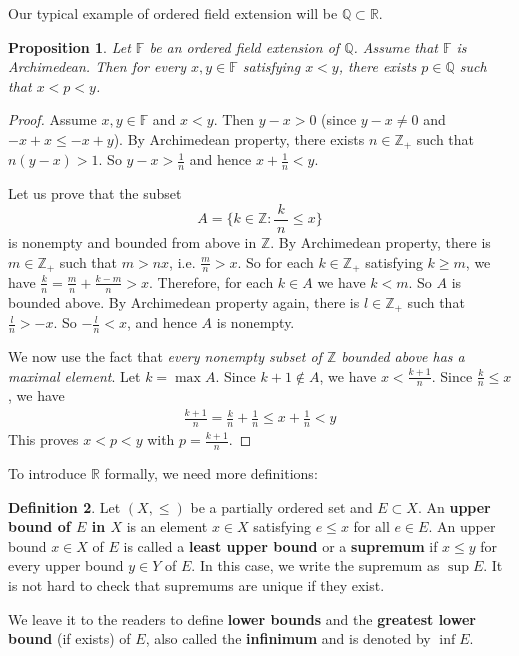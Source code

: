 \documentclass[12pt,b5paper,notitlepage]{article}
\theoremstyle{definition}
\newtheorem{df}{Definition}[section]
\theoremstyle{plain}
\newtheorem{pp}[df]{Proposition}
\newcommand{\Zbb}{\mathbb Z}
\newcommand{\Qbb}{\mathbb Q}
\newcommand{\Rbb}{\mathbb R}
\newcommand{\Fbb}{\mathbb F}
\numberwithin{equation}{section}
\begin{document}
Our typical example of ordered field extension will be $\Qbb\subset\Rbb$.

\begin{pp}\label{lb2}
Let $\Fbb$ be an ordered field extension  of $\Qbb$. Assume that $\Fbb$ is Archimedean. Then for every $x,y\in\Fbb$ satisfying $x<y$, there exists $p\in\Qbb$ such that $x<p<y$.
\end{pp}

\begin{proof}
Assume $x,y\in\Fbb$ and $x<y$. Then $y-x>0$ (since $y-x\neq 0$ and $-x+x\leq -x+y$). By Archimedean property, there exists $n\in\Zbb_+$ such that $n(y-x)>1$. So $\displaystyle y-x>\frac 1n$ and hence $\displaystyle x+\frac 1n<y$.

Let us prove that the subset
\begin{equation*}
A=\big\{k\in\Zbb: \frac {~k~}{n}\leq x\big\}
\end{equation*}
is nonempty and bounded from above in $\Zbb$. By Archimedean property, there is $m\in\Zbb_+$ such that $m>nx$, i.e. $\displaystyle \frac mn>x$. So for each $k\in\Zbb_+$ satisfying $k\geq m$, we have $\displaystyle \frac kn=\frac mn+\frac{k-m}n>x$. Therefore, for each $k\in A$ we have $k<m$. So $A$ is bounded above. By Archimedean property again, there is $l\in\Zbb_+$ such that $\displaystyle \frac ln>-x$. So $\displaystyle -\frac ln<x$, and hence $A$ is nonempty.

We now use the fact that \emph{every nonempty subset of $\Zbb$ bounded above has a maximal element}. Let $k=\max A$. Since $k+1\notin A$, we have $\displaystyle x<\frac{k+1}n$. Since $\displaystyle \frac kn\leq x$, we have
\begin{align*}
\frac{k+1}n=\frac kn+\frac 1n\leq x+\frac 1n<y
\end{align*}
This proves $x<p<y$ with $\displaystyle p=\frac{k+1}n$.
\end{proof}

To introduce $\Rbb$ formally, we need more definitions:

\begin{df}
Let $(X,\leq)$ be a partially ordered set and $E\subset X$. An \textbf{upper bound of $E$ in $X$}  is an element $x\in X$ satisfying $e\leq x$ for all $e\in E$. An upper bound $x\in X$ of $E$ is called a \textbf{least upper bound} or a \textbf{supremum}  if $x\leq y$ for every upper bound $y\in Y$ of $E$. In this case, we write the supremum as  $\sup E$. It is not hard to check that supremums are unique if they exist.

We leave it to the readers to define \textbf{lower bounds} and the \textbf{greatest lower bound} (if exists) of $E$, also called the \textbf{infinimum} and is denoted by  $\inf E$. \hfill\qedsymbol
\end{df}
\end{document}
